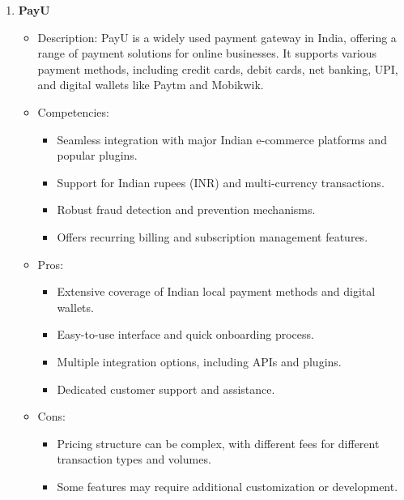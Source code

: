 \begin{enumerate}
\item \textbf{PayU}
\begin{itemize}
  \item Description: PayU is a widely used payment gateway in India, offering a range of payment solutions for online businesses. It supports various payment methods, including credit cards, debit cards, net banking, UPI, and digital wallets like Paytm and Mobikwik.
  \item Competencies:
    \begin{itemize}
      \item Seamless integration with major Indian e-commerce platforms and popular plugins.
      \item Support for Indian rupees (INR) and multi-currency transactions.
      \item Robust fraud detection and prevention mechanisms.
      \item Offers recurring billing and subscription management features.
    \end{itemize}
  \item Pros:
    \begin{itemize}
      \item Extensive coverage of Indian local payment methods and digital wallets.
      \item Easy-to-use interface and quick onboarding process.
      \item Multiple integration options, including APIs and plugins.
      \item Dedicated customer support and assistance.
    \end{itemize}
  \item Cons:
    \begin{itemize}
      \item Pricing structure can be complex, with different fees for different transaction types and volumes.
      \item Some features may require additional customization or development.
    \end{itemize}
\end{itemize}


\end{enumerate}
